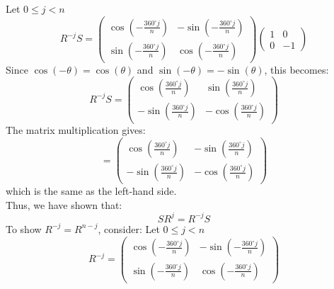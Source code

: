 \documentclass[12pt, letterpaper]{article}
\theoremstyle{definition}
\begin{document}
Let $0 \leq j < n$
\[
R^{-j} S = \begin{pmatrix}
\cos\left(-\frac{360^\circ j}{n}\right) & -\sin\left(-\frac{360^\circ j}{n}\right) \\
\sin\left(-\frac{360^\circ j}{n}\right) & \cos\left(-\frac{360^\circ j}{n}\right)
\end{pmatrix}
\begin{pmatrix}
1 & 0 \\
0 & -1
\end{pmatrix}
\]
Since \( \cos(-\theta) = \cos(\theta) \) and \( \sin(-\theta) = -\sin(\theta) \), this becomes:
\[
R^{-j} S = \begin{pmatrix}
\cos\left(\frac{360^\circ j}{n}\right) & \sin\left(\frac{360^\circ j}{n}\right) \\
-\sin\left(\frac{360^\circ j}{n}\right) & -\cos\left(\frac{360^\circ j}{n}\right)
\end{pmatrix}
\]
The matrix multiplication gives:
\[
= \begin{pmatrix}
\cos\left(\frac{360^\circ j}{n}\right) & -\sin\left(\frac{360^\circ j}{n}\right) \\
-\sin\left(\frac{360^\circ j}{n}\right) & -\cos\left(\frac{360^\circ j}{n}\right)
\end{pmatrix}
\]
which is the same as the left-hand side.\\
Thus, we have shown that:
\[
S R^j = R^{-j} S
\]
To show \( R^{-j} = R^{n-j} \), consider:
Let $0 \leq j < n$
\[
R^{-j} = \begin{pmatrix}
\cos\left(-\frac{360^\circ j}{n}\right) & -\sin\left(-\frac{360^\circ j}{n}\right) \\
\sin\left(-\frac{360^\circ j}{n}\right) & \cos\left(-\frac{360^\circ j}{n}\right)
\end{pmatrix}
\]
\end{document}
